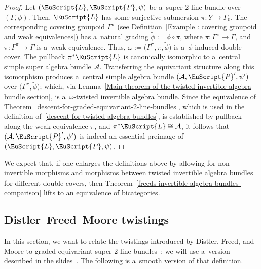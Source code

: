 \documentclass[10pt,a4paper]{amsart}
\numberwithin{equation}{section}
\def\mathscr#1{\EuScript{#1}}
\begin{document}
\begin{proof}
Let $(\mathscr{L},\mathscr{P},\psi)$ be a~super 2-line bundle over $(\Gamma,\phi)$. Then, $\mathscr{L}$ has some surjective submersion $\pi\colon Y \to \Gamma_0$. The corresponding covering groupoid $\Gamma^{\pi}$ (see Definition~\ref{Example : covering groupoid and weak equivalences}) has a~natural grading $\tilde\phi := \phi \circ \pi$, where $\pi\colon \Gamma^{\pi} \to \Gamma$, and $\pi\colon \Gamma^{\pi} \to \Gamma$ is a~weak equivalence. Thus, $\omega := \bigl(\Gamma^{\pi},\pi,\tilde\phi\bigr)$ is a~$\phi$-induced double cover. The pullback $\pi^{*}\mathscr{L}$ is canonically isomorphic to a~central simple super algebra bundle $\mathcal{A}$. Transferring the equivariant structure along this isomorphism produces a~central simple algebra bundle $(\mathcal{A},\mathscr{P}',\psi')$ over $\big(\Gamma^{\pi},\tilde\phi\big)$; which, via Lemma~\ref{Main theorem of the twisted invertible algebra bundle section}, is a~$\omega$-twisted invertible algebra bundle. Since the equivalence of Theorem~\ref{descent-for-graded-equivariant-2-line-bundles}, which is used in the definition of~\eqref{descent-for-twisted-algebra-bundles}, is established by pullback along the weak equivalence $\pi$, and $\pi^{*}\mathscr{L}\cong \mathcal{A}$, it follows that~${(\mathcal{A},\mathscr{P}',\psi')}$ is indeed an essential preimage of $(\mathscr{L},\mathscr{P},\psi)$.
\end{proof}

We expect that, if one enlarges the definitions above by allowing for non-invertible morphisms and morphisms between twisted invertible algebra bundles for different double covers, then
Theorem~\ref{freeds-invertible-algebra-bundles-comparison} lifts to an equivalence of bicategories.

\subsection{Distler--Freed--Moore twistings} \label{Distler Freed Moore twistings}


In this section, we want to relate the twistings introduced by Distler, Freed, and Moore to
graded-equivariant super 2-line bundles~\cite{Distler2011,distler2010spin}; we will use a~version described in the slides~\cite{Freed2009Slides}. The following is a~smooth version
of that definition.
\end{document}
